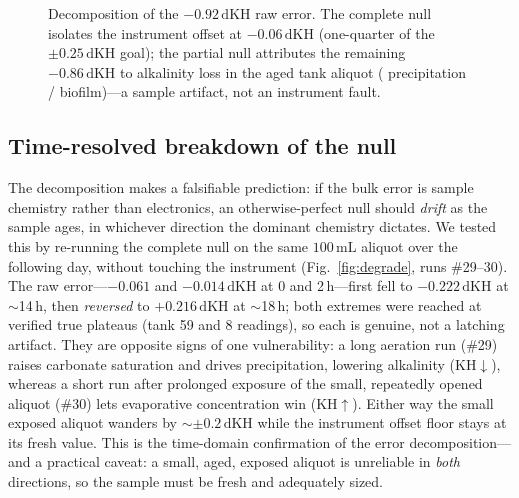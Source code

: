 \documentclass[11pt]{article}
\newcommand{\dkh}{\ensuremath{\,\mathrm{dKH}}}
\begin{document}
\begin{figure}[t]
\centering
{}
\caption{Decomposition of the $-0.92\dkh$ raw error. The complete null isolates
the instrument offset at $-0.06\dkh$ (one-quarter of the $\pm0.25\dkh$ goal); the
partial null attributes the remaining $-0.86\dkh$ to alkalinity loss in the aged
tank aliquot ( precipitation / biofilm)---a sample artifact, not an
instrument fault.}
\label{fig:budget}
\end{figure}

\subsection{Time-resolved breakdown of the null}
The decomposition makes a falsifiable prediction: if the bulk error is sample
chemistry rather than electronics, an otherwise-perfect null should \emph{drift}
as the sample ages, in whichever direction the dominant chemistry dictates. We
tested this by re-running the complete null on the same $100\,\mathrm{mL}$
aliquot over the following day, without touching the instrument
(Fig.~\ref{fig:degrade}, runs \#29--30). The raw error---$-0.061$ and
$-0.014\dkh$ at 0 and 2\,h---first fell to $-0.222\dkh$ at $\sim$14\,h, then
\emph{reversed} to $+0.216\dkh$ at $\sim$18\,h; both extremes were reached at
verified true plateaus (tank 59 and 8 readings), so each is genuine, not a
latching artifact. They are opposite signs of one vulnerability: a long aeration
run (\#29) raises carbonate saturation and drives  precipitation,
lowering alkalinity (KH$\downarrow$), whereas a short run after prolonged
exposure of the small, repeatedly opened aliquot (\#30) lets evaporative
concentration win (KH$\uparrow$). Either way the small exposed aliquot wanders by
$\sim\pm0.2\dkh$ while the instrument offset floor stays at its fresh value. This
is the time-domain confirmation of the error decomposition---and a practical
caveat: a small, aged, exposed aliquot is unreliable in \emph{both} directions,
so the sample must be fresh and adequately sized.
\end{document}
